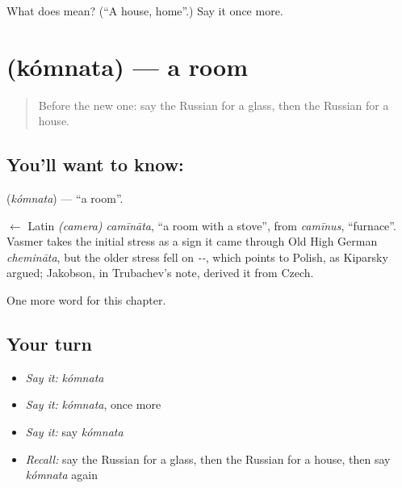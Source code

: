 \begin{tcolorbox}[breakable,colback=teal!4,colframe=teal!35!black,title={Before you move on}]
What does  mean? (\textquotedblleft{}A house, home\textquotedblright{}.) Say it once more.
\end{tcolorbox}
\section[\texorpdfstring{\ru{комната} (kómnata)}{комната (kómnata)}]{ (kómnata) — a room}

\label{lesson:RU-C48-room}



\begin{quote}
Before the new one: say the Russian for a glass, then the Russian for a house.
\end{quote}

\subsection*{You'll want to know: }
\textbf{} (\emph{kómnata}) — \textquotedblleft{}a room\textquotedblright{}.

\begin{cousinweb}
\textbf{} $\leftarrow$ Latin \emph{(camera) camīnāta}, \textquotedblleft{}a room with a stove\textquotedblright{}, from \emph{camīnus}, \textquotedblleft{}furnace\textquotedblright{}. Vasmer takes the initial stress as a sign it came through Old High German \emph{chemināta}, but the older stress fell on \emph{--}, which points to Polish, as Kiparsky argued; Jakobson, in Trubachev's note, derived it from Czech.
\end{cousinweb}

\begin{grammarlens}[title={What you've built}]
One more word for this chapter.
\end{grammarlens}

\subsection*{Your turn}
\begin{itemize}
\raggedright
  \item \emph{Say it:} \emph{kómnata}
  \item \emph{Say it:} \emph{kómnata}, once more
  \item \emph{Say it:} say \emph{kómnata}
  \item \emph{Recall:} say the Russian for a glass, then the Russian for a house, then say \emph{kómnata} again
\end{itemize}


